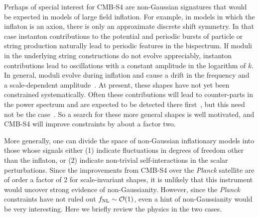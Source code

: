 Perhaps of special interest for CMB-S4 are non-Gaussian signatures that would be expected in models of large field inflation. For example, in models in which the inflaton is an axion, there is only an approximate discrete shift symmetry. In that case instanton contributions to the potential and periodic bursts of particle or string production naturally lead to periodic features in the bispectrum. If moduli in the underlying string constructions do not evolve appreciably, instanton contributions lead to oscillations with a constant amplitude in the logarithm of $k$. In general, moduli evolve during inflation and cause a drift in the frequency and a scale-dependent amplitude~\cite{Flauger:2014ana}. At present, these shapes have not yet been constrained systematically. Often these contributions will lead to counter-parts in the power spectrum and are expected to be detected there first~\cite{Behbahani:2011it}, but this need not be the case~\cite{Behbahani:2012be}. So a search for these more general shapes is well motivated, and CMB-S4 will improve constraints by about a factor two. 

More generally, one can divide the space of non-Gaussian inflationary models into those whose signals either (1) indicate fluctuations in degrees of freedom other than the inflaton, or (2) indicate non-trivial self-interactions in the scalar perturbations. Since the improvements from CMB-S4 over the {\it Planck} satellite are of order a factor of 2 for scale-invariant shapes, it is unlikely that this instrument would uncover strong evidence of non-Gaussianity. However, since the {\it Planck} constraints have not ruled out $f_{\rm NL}\sim\mathcal{O}(1)$, even a hint of non-Gaussianity would be very interesting. Here we briefly review the physics in the two cases.

